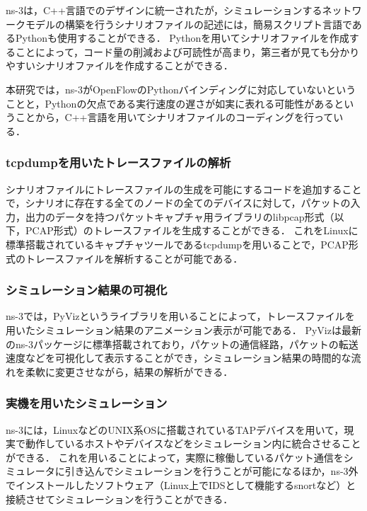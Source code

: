 ns-3は，C++言語でのデザインに統一されたが，シミュレーションするネットワークモデルの構築を行うシナリオファイルの記述には，簡易スクリプト言語であるPythonも使用することができる．
Pythonを用いてシナリオファイルを作成することによって，コード量の削減および可読性が高まり，第三者が見ても分かりやすいシナリオファイルを作成することができる．

本研究では，ns-3がOpenFlowのPythonバインディングに対応していないということと，Pythonの欠点である実行速度の遅さが如実に表れる可能性があるということから，C++言語を用いてシナリオファイルのコーディングを行っている．

\subsubsection{tcpdumpを用いたトレースファイルの解析}

シナリオファイルにトレースファイルの生成を可能にするコードを追加することで，シナリオに存在する全てのノードの全てのデバイスに対して，パケットの入力，出力のデータを持つパケットキャプチャ用ライブラリのlibpcap形式（以下，PCAP形式）のトレースファイルを生成することができる．
これをLinuxに標準搭載されているキャプチャツールであるtcpdumpを用いることで，PCAP形式のトレースファイルを解析することが可能である．

\subsubsection{シミュレーション結果の可視化}

ns-3では，PyVizというライブラリを用いることによって，トレースファイルを用いたシミュレーション結果のアニメーション表示が可能である．
PyVizは最新のns-3パッケージに標準搭載されており，パケットの通信経路，パケットの転送速度などを可視化して表示することができ，シミュレーション結果の時間的な流れを柔軟に変更させながら，結果の解析ができる．

\subsubsection{実機を用いたシミュレーション}

ns-3には，LinuxなどのUNIX系OSに搭載されているTAPデバイスを用いて，現実で動作しているホストやデバイスなどをシミュレーション内に統合させることができる．
これを用いることによって，実際に稼働しているパケット通信をシミュレータに引き込んでシミュレーションを行うことが可能になるほか，ns-3外でインストールしたソフトウェア（Linux上でIDSとして機能するsnortなど）と接続させてシミュレーションを行うことができる．

